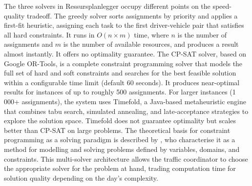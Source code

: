 The three solvers in Ressursplanlegger occupy different points on the speed-quality tradeoff. The greedy solver sorts assignments by priority and applies a first-fit heuristic, assigning each task to the first driver-vehicle pair that satisfies all hard constraints. It runs in $O(n \times m)$ time, where $n$ is the number of assignments and $m$ is the number of available resources, and produces a result almost instantly. It offers no optimality guarantee. The CP-SAT solver, based on Google OR-Tools, is a complete constraint programming solver that models the full set of hard and soft constraints and searches for the best feasible solution within a configurable time limit (default 60 seconds). It produces near-optimal results for instances of up to roughly 500 assignments. For larger instances (1\,000+ assignments), the system uses Timefold, a Java-based metaheuristic engine that combines tabu search, simulated annealing, and late-acceptance strategies to explore the solution space. Timefold does not guarantee optimality but scales better than CP-SAT on large problems. The theoretical basis for constraint programming as a solving paradigm is described by \textcite{rossi2006handbook}, who characterise it as a method for modelling and solving problems defined by variables, domains, and constraints. This multi-solver architecture allows the traffic coordinator to choose the appropriate solver for the problem at hand, trading computation time for solution quality depending on the day's complexity.
